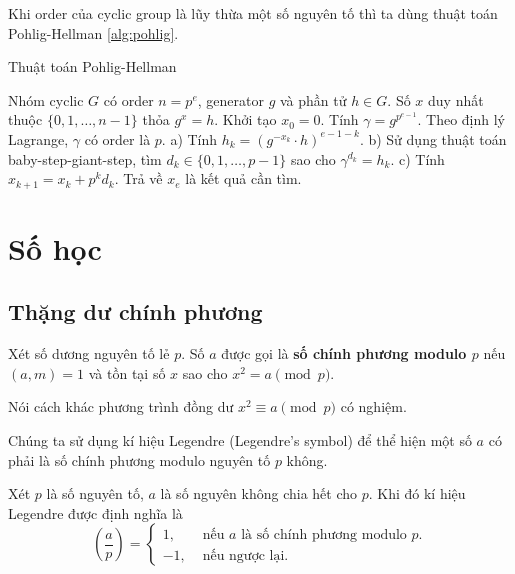 \documentclass{mynotes}
\theoremstyle{definition}
\begin{document}
Khi order của cyclic group là lũy thừa một số nguyên tố thì ta dùng thuật toán Pohlig-Hellman \ref{alg:pohlig}.

\begin{algorithm}[H]
    \caption{Thuật toán Pohlig-Hellman}
    \label{alg:pohlig}
    \begin{algorithmic}[1]
        \Require Nhóm cyclic $G$ có order $n=p^e$, generator $g$ và phần tử $h \in G$.
        \Ensure Số $x$ duy nhất thuộc $\{ 0, 1, \ldots, n-1 \}$ thỏa $g^x = h$.
        \State Khởi tạo $x_0 = 0$.
        \State Tính $\gamma = g^{p^{e-1}}$. Theo định lý Lagrange, $\gamma$ có order là $p$.
            \State a) Tính $h_k = (g^{-x_k} \cdot h)^{e-1-k}$.
            \State b) Sử dụng thuật toán baby-step-giant-step, tìm $d_k \in \{ 0, 1, \ldots, p-1 \}$ sao cho $\gamma^{d_k} = h_k$. %
            \State c) Tính $x_{k+1} = x_k + p^k d_k$.
        \EndFor
        \State Trả về $x_e$ là kết quả cần tìm.
    \end{algorithmic}
\end{algorithm}

\chapter{Số học}

\section{Thặng dư chính phương}

\begin{definition}
    Xét số dương nguyên tố lẻ $p$. Số $a$ được gọi là \textbf{số chính phương modulo $p$} nếu $(a, m) = 1$ và tồn tại số $x$ sao cho $x^2 = a \pmod p$.

    Nói cách khác phương trình đồng dư $x^2 \equiv a \pmod p$ có nghiệm.
\end{definition}

Chúng ta sử dụng kí hiệu Legendre (Legendre's symbol) để thể hiện một số $a$ có phải là số chính phương modulo nguyên tố $p$ không.

\begin{definition}
    Xét $p$ là số nguyên tố, $a$ là số nguyên không chia hết cho $p$. Khi đó kí hiệu Legendre được định nghĩa là
    \begin{equation}
        \left(\frac{a}{p}\right) = \begin{cases}
            1, & \text{ nếu } a \text{ là số chính phương modulo } p. \\
            -1, & \text{ nếu ngược lại.}
        \end{cases}
    \end{equation}
\end{definition}
\end{document}
